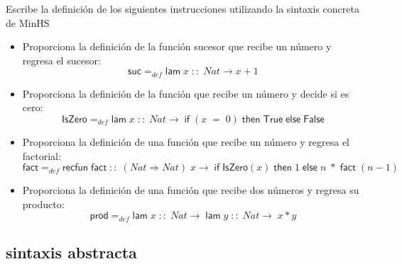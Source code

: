     \begin{exercise}
    Escribe la definición de los siguientes instrucciones utilizando la sintaxis concreta de \textsf{MinHS}\\

	\begin{itemize}
		\item Proporciona la definición de la función sucesor que recibe un número y regresa el sucesor: 
			$$ \textsf{suc} =_{def} \textsf{lam}\; x\;::\; \textit{Nat} \rightarrow x + 1$$
		\item Proporciona la definición de la función que recibe un número y decide si es cero:
			 $$ \textsf{IsZero} =_{def} \textsf{lam}\; x\;::\; \textit{Nat} \rightarrow\; \textsf{if}\; (x\; =\; 0) \; \textsf{then}\; \textsf{True}\; \textsf{else}\; \textsf{False}$$
		\item Proporciona la definición de una función que recibe un número y regresa el factorial:
			 $$ \textsf{fact} =_{def} \textsf{recfun}\; \textsf{fact}\; ::\; (\textit{Nat} \Rightarrow \textit{Nat})\; x \rightarrow\; \textsf{if}\; \textsf{IsZero}(x)\; \textsf{then}\; 1\; \textsf{else}\; n\; *\; \textsf{fact}\; (n-1)$$
		\item Proporciona la definición de una función que recibe dos números y regresa su producto:
			$$ \textsf{prod} =_{def} \textsf{lam}\; x\; ::\; Nat \rightarrow\; \textsf{lam}\; y\; ::\; Nat \rightarrow\; x*y$$
	\end{itemize}

    \end{exercise}

\subsection{sintaxis abstracta}

